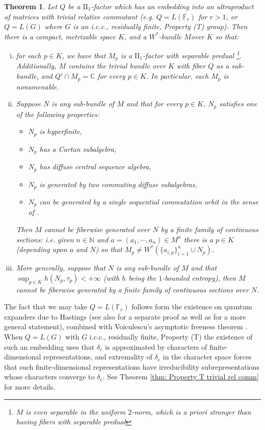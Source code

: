 \documentclass[10pt]{amsart}
\newtheorem{thm}{Theorem}[section]
\theoremstyle{definition}
\numberwithin{equation}{section}
\newcommand{\bC}{{\mathbb C}}
\newcommand{\bF}{{\mathbb F}}
\newcommand{\bN}{{\mathbb N}}
\begin{document}
\begin{thm}\label{thm: main thm intro}
Let $Q$ be a $\textrm{II}_{1}$-factor which has an embedding into an ultraproduct of matrices with trivial relative commutant (e.g. $Q=L(\bF_{r})$ for $r>1$, or $Q=L(G)$ where $G$ is an i.c.c., residually finite, Property (T) group). Then there is a compact, metrizable space $K$, and a $W^{*}$-bundle $M$over $K$ so that:
\begin{enumerate}[(i)]
    \item for each $p\in K$, we have that $M_{p}$ is a   $\textrm{II}_{1}$-factor with separable predual \footnote{$M$ is even separable in the uniform $2$-norm, which is a priori stronger than having fibers with separable predual}. Additionally, $M$ contains the trivial bundle over $K$ with fiber $Q$ as a sub-bundle, and $Q'\cap M_{p}=\bC$ for every $p\in K$. In particular, each $M_{p}$ is nonamenable. \label{item: intro rel commm}
    \item \label{item: intro classes} Suppose $N$ is any sub-bundle of $M$ and that for every $p\in K$, $N_{p}$ satisfies one of the following properties:
    \begin{itemize}
    \item $N_{p}$ is hyperfinite, 
        \item $N_{p}$ has a Cartan subalgebra,
        \item $N_{p}$ has diffuse central sequence algebra,
        \item  $N_{p}$ is generated by two commuting diffuse subalgebras,
        \item $N_{p}$ can be generated by a single sequential commutation orbit in the sense of \cite{SeqCommutation}.
    \end{itemize}
    Then $M$ cannot be fiberwise generated over $N$ by a finite family of continuous sections: i.e. given $n\in \bN$ and $a=(a_{1},\cdots,a_{n})\in M^{n}$ there is a $p\in K$ (depending upon $a$ and $N$) so that $M_{p}\ne W^{*}(\{a_{i,p}\}_{i=1}^{n}\cup N_{p})$. 
    \item \label{item: unfiromly S1B INTRO} More generally, suppose that $N$ is any sub-bundle of $M$ and that $\sup_{p\in K}h(N_{p},\tau_{p})<+\infty$ (with $h$ being the $1$-bounded entropy), then $M$ cannot be fiberwise generated by a finite family of continuous sections over $N$. 
\end{enumerate}
\end{thm}

The fact that we may take $Q=L(\bF_{r})$ follows form the existence  on quantum expanders due to Hastings \cite{Hastings} (see also \cite{PisierQuantumExpander} for a separate proof as well as  \cite{CollinsBordenave} for  a more general statement), combined with Voiculescu's asymptotic freeness theorem \cite[Theorem 3.8]{VoicAsyFree}. When $Q=L(G)$ with $G$ i.c.c., residually finite, Property (T) the existence of such an embedding uses that $\delta_{e}$ is approximated by characters of finite-dimensional representations, and extremality of $\delta_{e}$ in the character space forces that such finite-dimensional representations have irreducibility subrepresentations whose characters converge to $\delta_{e}$. See Theorem \ref{thm: Property T trivial rel comm} for more details.
\end{document}
